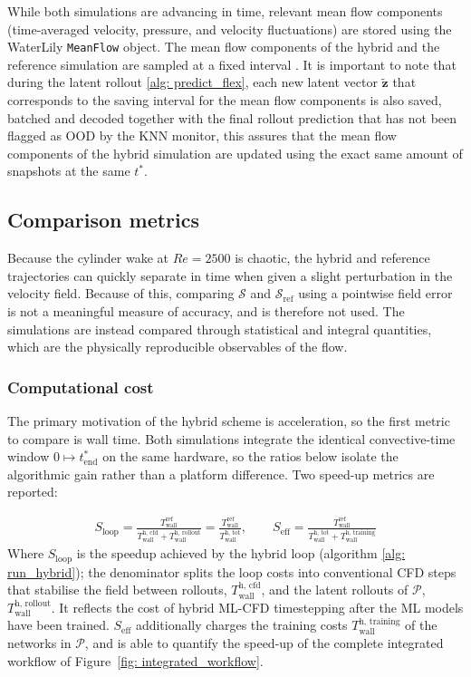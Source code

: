 While both simulations are advancing in time, relevant mean flow components (time-averaged velocity, pressure, and velocity fluctuations) are stored using the WaterLily \texttt{MeanFlow} object. The mean flow components of the hybrid and the reference simulation are sampled at a fixed interval . It is important to note that during the latent rollout \ref{alg: predict_flex}, each new latent vector $\tilde{\mathbf{z}}$ that corresponds to the saving interval for the mean flow components is also saved, batched and decoded together with the final rollout prediction that has not been flagged as OOD by the KNN monitor, this assures that the mean flow components of the hybrid simulation are updated using the exact same amount of snapshots at the same $t^*$. 

\subsection{Comparison metrics} 
\label{subsect: 4_metrics}
Because the cylinder wake at $Re = 2500$ is chaotic, the hybrid and reference trajectories can quickly separate in time when given a slight perturbation in the velocity field. Because of this, comparing $\mathcal{S}$ and $\mathcal{S}_\text{ref}$ using a pointwise field error is not a meaningful measure of accuracy, and is therefore not used. The simulations are instead compared through statistical and integral quantities, which are the physically reproducible observables of the flow.

\subsubsection{Computational cost}
The primary motivation of the hybrid scheme is acceleration, so the first metric to compare is wall time. Both simulations integrate the identical convective-time window $0 \mapsto t^*_\text{end}$ on the same hardware, so the ratios below isolate the algorithmic gain rather than a platform difference. Two speed-up metrics are reported:

\begin{align}
  S_\text{loop} = \frac{T_\text{wall}^\text{ref}}{T_\text{wall}^\text{h, cfd} + T_\text{wall}^\text{h, rollout}} = \frac{T_\text{wall}^\text{ref}}{T_\text{wall}^\text{h, tot}},
  \qquad
  S_\text{eff}
  = \frac{T_\text{wall}^\text{ref}}{T_\text{wall}^\text{h, tot} + T_\text{wall}^\text{h, training}}
\end{align}
Where $S_\text{loop}$ is the speedup achieved by the hybrid loop (algorithm \ref{alg: run_hybrid}); the denominator splits the loop costs into conventional CFD steps that stabilise the field between rollouts, $T_\text{wall}^\text{h, cfd}$, and the latent rollouts of $\mathcal{P}$, $T_\text{wall}^\text{h, rollout}$. It reflects the cost of hybrid ML-CFD timestepping after the ML models have been trained. $S_\text{eff}$ additionally charges the training costs $T_\text{wall}^\text{h, training}$ of the networks in $\mathcal{P}$, and is able to quantify the speed-up of the complete integrated workflow of Figure~\ref{fig: integrated_workflow}. 

